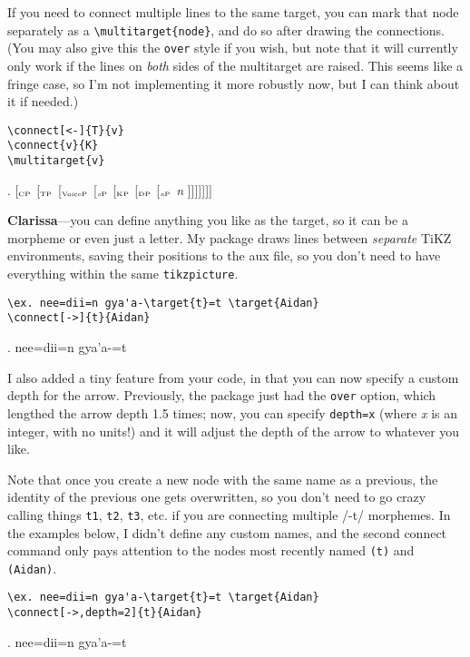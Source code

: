 \documentclass{article}
\newcommand{\subsc}[1]{$_{\textrm{\tiny #1}}$}
\begin{document}
If you need to connect multiple lines to the same target, you can mark that node separately as a \verb;\multitarget{node};, and do so after drawing the connections. (You may also give this the \verb;over; style if you wish, but note that it will currently only work if the lines on \textit{both} sides of the multitarget are raised. This seems like a fringe case, so I'm not implementing it more robustly now, but I can think about it if needed.)

\begin{verbatim}
\connect[<-]{T}{v}
\connect{v}{K}
\multitarget{v}
\end{verbatim}

\ex.	[\subsc{CP} [\subsc{TP}  [\subsc{VoiceP}  [\subsc{\textit{v}P}  [\subsc{KP}  [\subsc{DP}  [\subsc{\textit{n}P} \textit{n} ]]]]]]]


\clearpage


\textbf{Clarissa}---you can define anything you like as the target, so it can be a morpheme or even just a letter. My package draws lines between \textit{separate} TiKZ environments, saving their positions to the aux file, so you don't need to have everything within the same \texttt{tikzpicture}.

\begin{verbatim}
\ex. nee=dii=n gya'a-\target{t}=t \target{Aidan}
\connect[->]{t}{Aidan}
\end{verbatim}

\ex. nee=dii=n gya'a-=t 


I also added a tiny feature from your code, in that you can now specify a custom depth for the arrow. Previously, the package just had the \texttt{over} option, which lengthed the arrow depth 1.5 times; now, you can specify \texttt{depth=x} (where \textit{x} is an integer, with no units!) and it will adjust the depth of the arrow to whatever you like.

Note that once you create a new node with the same name as a previous, the identity of the previous one gets overwritten, so you don't need to go crazy calling things \texttt{t1}, \texttt{t2}, \texttt{t3}, etc. if you are connecting multiple /-t/ morphemes. In the examples below, I didn't define any custom names, and the second connect command only pays attention to the nodes most recently named \texttt{(t)} and \texttt{(Aidan)}.

\begin{verbatim}
\ex. nee=dii=n gya'a-\target{t}=t \target{Aidan}
\connect[->,depth=2]{t}{Aidan}
\end{verbatim}

\ex. nee=dii=n gya'a-=t 

\end{document}
